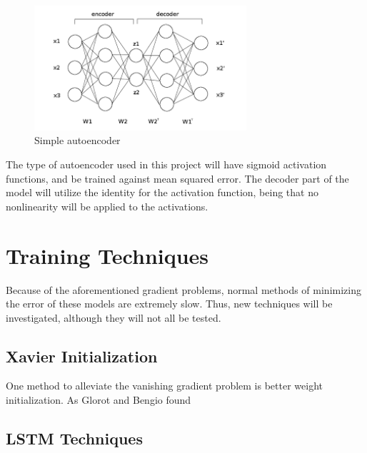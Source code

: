 \documentclass{article}
\begin{document}
\begin{figure}[H]
	\centering
	\caption{Simple autoencoder}
	\includegraphics[width=0.7\textwidth]{autoencoderDiagram.jpg}
\end{figure}

The type of autoencoder used in this project will have sigmoid activation
functions, and be trained against mean squared error. The decoder part of the
model will utilize the identity for the activation function, being that no
nonlinearity will be applied to the activations.

\section{Training Techniques}
Because of the aforementioned gradient problems, normal methods of minimizing
the error of these models are extremely slow. Thus, new techniques will be
investigated, although they will not all be tested.

\subsection{Xavier Initialization}
One method to alleviate the vanishing gradient problem is better weight
initialization. As Glorot and Bengio found

\subsection{LSTM Techniques}
\end{document}
